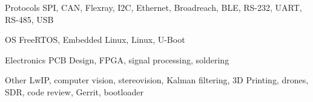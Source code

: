 


\begin{cvskills}


\cvskill
{Protocols} %
{SPI, CAN, Flexray, I2C, Ethernet, Broadreach, BLE, RS-232, UART, RS-485, USB} %


\cvskill
{OS} %
{FreeRTOS, Embedded Linux, Linux, U-Boot} %


\cvskill
{Electronics} %
{PCB Design, FPGA, signal processing, soldering} %


\cvskill
{Other} %
{LwIP, computer vision, stereovision, Kalman filtering, 3D Printing, drones, SDR, code review, Gerrit, bootloader} %


\end{cvskills}
